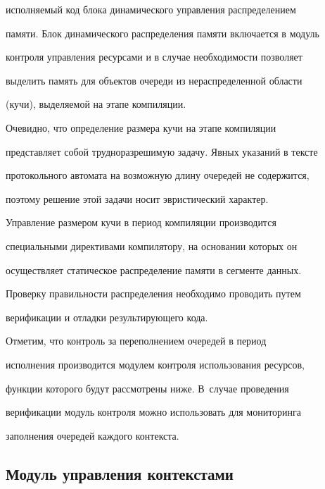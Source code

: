 исполняемый код блока динамического управления распределением 


памяти. Блок динамического распределения памяти включается в модуль 


контроля управления ресурсами и в случае необходимости позволяет 


выделить память для объектов очереди из нераспределенной области 


(кучи), выделяемой на этапе компиляции.


      


      Очевидно, что определение размера кучи на этапе компиляции 


представляет собой трудноразрешимую задачу. Явных указаний в тексте 


протокольного автомата на возможную длину очередей не содержится, 


поэтому решение этой задачи носит эвристический характер. 


      


      Управление размером кучи в период компиляции производится  


специальными директивами компилятору, на основании которых он 


осуществляет статическое распределение памяти в сегменте данных. 


Проверку правильности распределения необходимо проводить путем 


верификации и отладки результирующего кода.


      


      Отметим, что контроль за переполнением очередей в период 


исполнения производится модулем контроля использования ресурсов, 


функции которого будут рассмотрены ниже. В~случае проведения 


верификации модуль контроля можно использовать  для мониторинга 


заполнения очередей каждого контекста.







      


      \subsection{Модуль управления контекстами}


